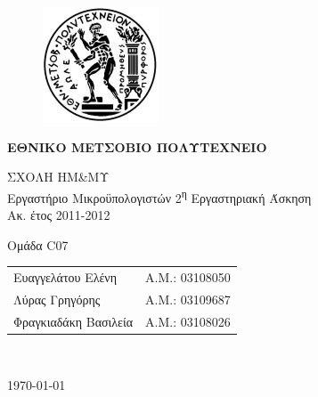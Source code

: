 \begin{titlepage}
\begin{center}
\begin{figure}[t] 
     \includegraphics[scale=0.7]{title/ntua_logo}
\end{figure}
\begin{LARGE}\textbf{ΕΘΝΙΚΟ ΜΕΤΣΟΒΙΟ ΠΟΛΥΤΕΧΝΕΙΟ\\}\end{LARGE}
\vspace{2cm}
\begin{Large}
ΣΧΟΛΗ ΗΜ\&ΜΥ\\
Εργαστήριο Μικροϋπολογιστών
2\textsuperscript{η} Εργαστηριακή Άσκηση\\
Ακ. έτος 2011-2012\\
\end{Large}
\vspace{5cm}
\Large Ομάδα C07\\
\vspace{1cm}
\begin{tabular}{l r}
\Large{Ευαγγελάτου Ελένη}&
\large{Α.Μ.: 03108050}\\
\Large{Λύρας Γρηγόρης}&
\large{Α.Μ.: 03109687}\\
\Large{Φραγκιαδάκη Βασιλεία}&
\large{Α.Μ.: 03108026}\\
\end{tabular}\\
\vspace{5cm}

\vfill
\large\today\\
\end{center}
\end{titlepage}

